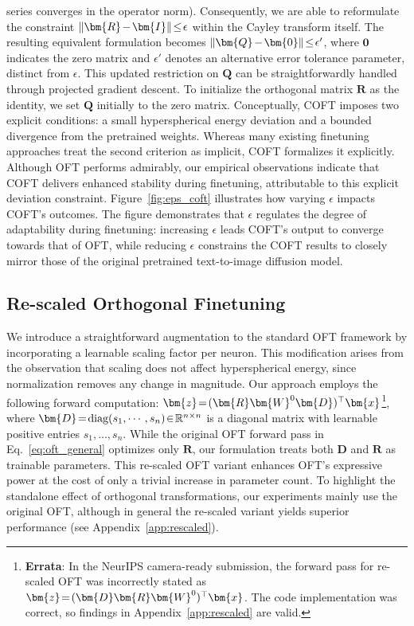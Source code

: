 series converges in the operator norm). Consequently, we are able to reformulate the constraint $\thickmuskip=2mu \medmuskip=2mu\|\bm{R}-\bm{I}\|\leq\epsilon$ within the Cayley transform itself. The resulting equivalent formulation becomes $\thickmuskip=2mu \medmuskip=2mu \|\bm{Q}-\bm{0}\|\leq\epsilon'$, where $\bm{0}$ indicates the zero matrix and $\epsilon'$ denotes an alternative error tolerance parameter, distinct from $\epsilon$. This updated restriction on $\bm{Q}$ can be straightforwardly handled through projected gradient descent. To initialize the orthogonal matrix $\bm{R}$ as the identity, we set $\bm{Q}$ initially to the zero matrix. Conceptually, COFT imposes two explicit conditions: a small hyperspherical energy deviation and a bounded divergence from the pretrained weights. Whereas many existing finetuning approaches treat the second criterion as implicit, COFT formalizes it explicitly. Although OFT performs admirably, our empirical observations indicate that COFT delivers enhanced stability during finetuning, attributable to this explicit deviation constraint. Figure~\ref{fig:eps_coft} illustrates how varying $\epsilon$ impacts COFT's outcomes. The figure demonstrates that $\epsilon$ regulates the degree of adaptability during finetuning: increasing $\epsilon$ leads COFT's output to converge towards that of OFT, while reducing $\epsilon$ constrains the COFT results to closely mirror those of the original pretrained text-to-image diffusion model.

\subsection{Re-scaled Orthogonal Finetuning}

We introduce a straightforward augmentation to the standard OFT framework by incorporating a learnable scaling factor per neuron. This modification arises from the observation that scaling does not affect hyperspherical energy, since normalization removes any change in magnitude. Our approach employs the following forward computation: $\thickmuskip=2mu \medmuskip=2mu\bm{z}=(\bm{R}\bm{W}^0\bm{D})^\top\bm{x}$\footnote{\textbf{Errata}: In the NeurIPS camera-ready submission, the forward pass for re-scaled OFT was incorrectly stated as $\thickmuskip=2mu \medmuskip=2mu\bm{z}=(\bm{D}\bm{R}\bm{W}^0)^\top\bm{x}$. The code implementation was correct, so findings in Appendix~\ref{app:rescaled} are valid.}, where $\thickmuskip=2mu \medmuskip=2mu \bm{D}=\text{diag}(s_1,\cdots,s_n)\in\mathbb{R}^{n\times n}$ is a diagonal matrix with learnable positive entries $s_1,\ldots,s_n$. While the original OFT forward pass in Eq.~\eqref{eq:oft_general} optimizes only $\bm{R}$, our formulation treats both $\bm{D}$ and $\bm{R}$ as trainable parameters. This re-scaled OFT variant enhances OFT’s expressive power at the cost of only a trivial increase in parameter count. To highlight the standalone effect of orthogonal transformations, our experiments mainly use the original OFT, although in general the re-scaled variant yields superior performance (see Appendix~\ref{app:rescaled}).

